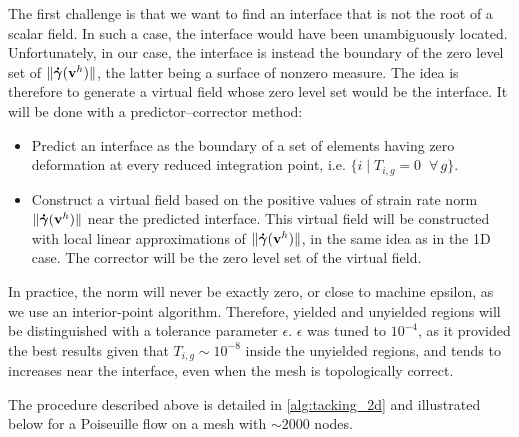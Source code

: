 \documentclass[11 pt]{report}
\begin{document}
The first challenge is that we want to find an interface that is not the root of a scalar field. In such a case, the interface would have been unambiguously located. Unfortunately, in our case, the interface is instead the boundary of the zero level set of $\|\boldsymbol{\dot \gamma}(\mathbf{v}^h)\|$, the latter being a surface of nonzero measure. The idea is therefore to generate a virtual field whose zero level set would be the interface. It will be done with a predictor–corrector method:
\begin{itemize}
    \item Predict an interface as the boundary of a set of elements having zero deformation at every reduced integration point, i.e. $\{i \;\vert\; T_{i,g} = 0 \;\; \forall\, g\}$.
    \item Construct a virtual field based on the positive values of strain rate norm $\|\boldsymbol{\dot \gamma}(\mathbf{v}^h)\|$ near the predicted interface. This virtual field will be constructed with local linear approximations of $\|\boldsymbol{\dot \gamma}(\mathbf{v}^h)\|$, in the same idea as in the 1D case. The corrector will be the zero level set of the virtual field.
\end{itemize}

In practice, the norm will never be exactly zero, or close to machine epsilon, as we use an interior-point algorithm. Therefore, yielded and unyielded regions will be distinguished with a tolerance parameter $\epsilon$. $\epsilon$ was tuned to $10^{-4}$, as it provided the best results given that $T_{i,g} \sim 10^{-8}$ inside the unyielded regions, and tends to increases near the interface, even when the mesh is topologically correct.

The procedure described above is detailed in \cref{alg:tacking_2d} and illustrated below for a Poiseuille flow on a mesh with $\sim 2000$ nodes.
\end{document}
